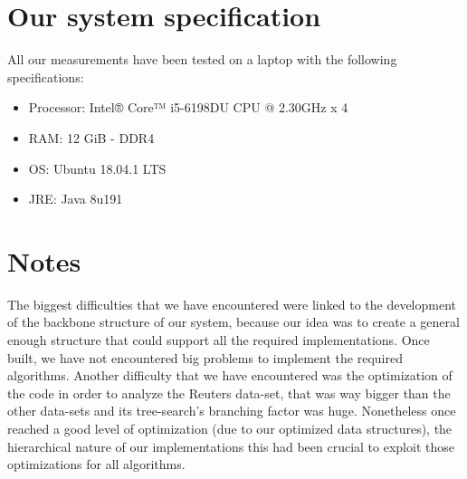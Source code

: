 \documentclass[10pt, a4paper]{article}
\begin{document}
	\section{Our system specification}
		All our measurements have been tested on a laptop with the following specifications:
		\begin{multicols}{2}
			\begin{itemize}
				\item Processor: Intel® Core™ i5-6198DU CPU @ 2.30GHz x 4 
				\item RAM: 12 GiB - DDR4
				\item OS: Ubuntu 18.04.1 LTS
				\item JRE: Java 8u191
			\end{itemize}
		\end{multicols}
	
	\section{Notes}
	The biggest difficulties that we have encountered were linked to the development of the backbone structure of our system, because our idea was to create a general enough structure that could support all the required implementations. Once built, we have not encountered big problems to implement the required algorithms. Another difficulty that we have encountered was the optimization of the code in order to analyze the Reuters data-set, that was way bigger than the other data-sets and its tree-search's branching factor was huge. Nonetheless once reached a good level of optimization (due to our optimized data structures), the hierarchical nature of our implementations  this had been crucial to exploit those optimizations for all algorithms.
		
\end{document}
